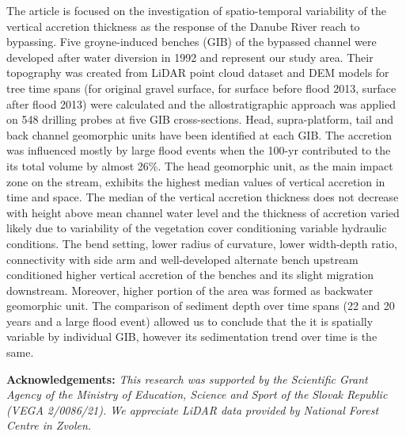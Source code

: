 {The article is focused on the investigation of spatio-temporal variability of the vertical accretion thickness as the response of the Danube River reach to bypassing. Five groyne-induced benches (GIB) of the bypassed channel were developed after water diversion in 1992 and represent our study area. Their topography was created from LiDAR point cloud dataset and DEM models for tree time spans (for original gravel surface, for surface before flood 2013, surface after flood 2013) were calculated and the allostratigraphic approach was applied on 548 drilling probes at five GIB cross-sections.  Head, supra-platform, tail and back channel geomorphic units have been identified at each GIB. The accretion was influenced mostly by large flood events when the 100-yr contributed to the its total volume by almost 26\%. The head geomorphic unit, as the main impact zone on the stream, exhibits the highest median values of vertical accretion in time and space. The median of the vertical accretion thickness does not decrease with height above mean channel water level and the thickness of accretion varied likely due to variability of the vegetation cover conditioning variable hydraulic conditions. The bend setting, lower radius of curvature, lower width-depth ratio, connectivity with side arm and well-developed alternate bench upstream conditioned higher vertical accretion of the benches and its slight migration downstream. Moreover, higher portion of the area was formed as backwater geomorphic unit. The comparison of sediment depth over time spans (22 and 20 years and a large flood event) allowed us to conclude that the it is spatially variable by individual GIB, however its sedimentation trend over time is the same.

\vspace{0.5em}
\noindent
\textbf{Acknowledgements:} \textit{This research was supported by the Scientific Grant Agency of the Ministry of Education, Science and Sport of the Slovak Republic (VEGA 2/0086/21). We appreciate LiDAR data provided by National Forest Centre in Zvolen.}
}%
{}%


